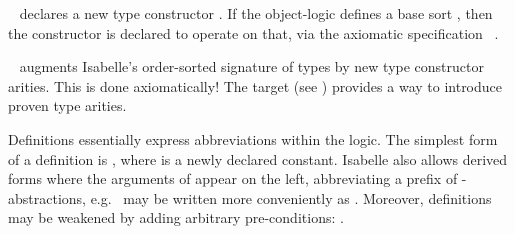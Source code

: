 \begin{isabellebody}
\begin{isamarkuptext}
\begin{description}
  \item \hyperlink{command.typedecl}{\mbox{}}~ declares a new
  type constructor .  If the object-logic defines a base sort
  , then the constructor is declared to operate on that, via
  the axiomatic specification \hyperlink{command.arities}{\mbox{}}~.

  \item \hyperlink{command.arities}{\mbox{}}~ augments
  Isabelle's order-sorted signature of types by new type constructor
  arities.  This is done axiomatically!  The \hyperlink{command.instantiation}{\mbox{}}
  target (see ) provides a way to introduce
  proven type arities.

  \end{description}%
\end{isamarkuptext}%
\isamarkuptrue%
%
\isamarkuptrue%
%
\begin{isamarkuptext}%
Definitions essentially express abbreviations within the logic.  The
  simplest form of a definition is , where  is a newly declared constant.  Isabelle also allows derived forms
  where the arguments of  appear on the left, abbreviating a
  prefix of \isa{{\isasymlambda}}-abstractions, e.g.\  may be
  written more conveniently as .  Moreover,
  definitions may be weakened by adding arbitrary pre-conditions:
  .


\end{isamarkuptext}
\end{isabellebody}
